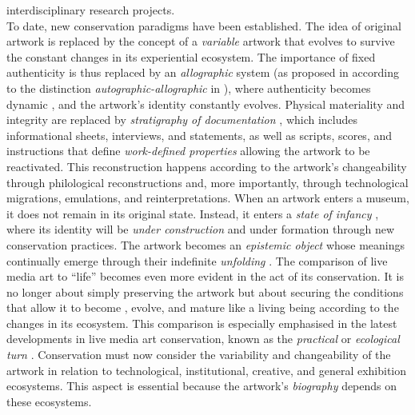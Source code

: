 interdisciplinary research projects.\\
To date, new conservation paradigms have been established. The idea of original artwork is replaced by the concept of a \textit{variable} artwork \cite{depocas2003variable} that evolves to survive the constant changes in its experiential ecosystem. The importance of fixed authenticity is thus replaced by an \textit{allographic} system (as proposed in \cite{laurenson2004management} according to the distinction \textit{autographic-allographic} in \cite{goodman1968languages}), where authenticity becomes dynamic \cite{innocenti2012bridging, innocenti2012rethinking}, and the artwork’s identity constantly evolves. Physical materiality and integrity are replaced by \textit{stratigraphy of documentation} \cite{holling2016aesthetics}, which includes informational sheets, interviews, and statements, as well as scripts, scores, and instructions that define \textit{work-defined properties} \cite{laurenson2006authenticity} allowing the artwork to be reactivated. This reconstruction happens according to the artwork’s changeability \cite{holling2017paik} through philological reconstructions and, more importantly, through technological migrations, emulations, and reinterpretations. When an artwork enters a museum, it does not remain in its original state. Instead, it enters a \textit{state of infancy} \cite{phillips2015reporting}, where its identity will be \textit{under construction} \cite{dekker2022documentation} and under formation \cite{phillips2015reporting} through new conservation practices. The artwork becomes an \textit{epistemic object} whose meanings continually emerge through their indefinite \textit{unfolding} \cite{laurenson2016practices}. The comparison of live media art to ``life'' becomes even more evident in the act of its conservation. It is no longer about simply preserving the artwork but about securing the conditions that allow it to become \cite{butler2018my, castriota2019authenticity}, evolve, and mature like a living being according to the changes in its ecosystem. This comparison is especially emphasised in the latest developments in live media art conservation, known as the \textit{practical} or \textit{ecological turn} \cite{van2023theories}. Conservation must now consider the variability and changeability of the artwork in relation to technological, institutional, creative, and general exhibition ecosystems. This aspect is essential because the artwork’s \textit{biography} \cite{van2011reflections} depends on these ecosystems.\\
